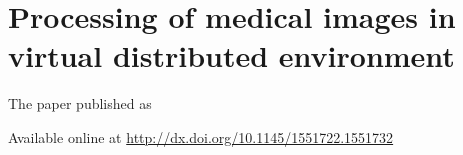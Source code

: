 

\chapter{Processing of medical images in virtual distributed environment}\label{app:processing}
The paper \cite{kulhanek2009} published as
 

Available online at \url{http://dx.doi.org/10.1145/1551722.1551732}


%
